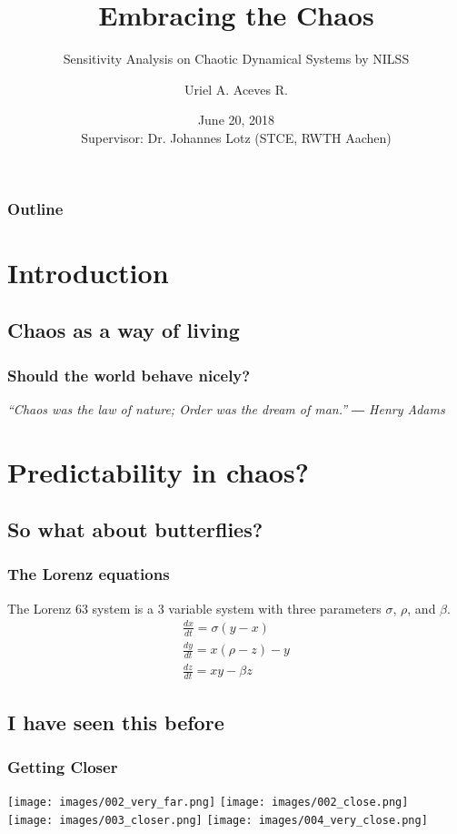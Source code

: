 \documentclass{beamer}
\title{Embracing the Chaos}
\subtitle{Sensitivity Analysis on Chaotic Dynamical Systems by NILSS}
\author{Uriel A. Aceves R.}
\date{June 20, 2018\\ \vspace{0.3cm}
Supervisor: Dr. Johannes Lotz (STCE, RWTH Aachen)}
\institute{\url{uriel.aceves@rwth-aachen.de}}
\begin{document}
\begin{frame}[plain,t]
\titlepage
\end{frame}

\begin{frame}%
	\frametitle{Outline}
  \begin{footnotesize}
\tableofcontents
\end{footnotesize}
\end{frame}

\section{Introduction}
  \subsection{Chaos as a way of living}

\begin{frame}
  \frametitle{Should the world behave nicely?}
  \textit{
  “Chaos was the law of nature; Order was the dream of man.”
  ― Henry Adams}

\end{frame}

\section{Predictability in chaos?}
\subsection{So what about butterflies?}

\begin{frame}
  \frametitle{The Lorenz equations}
  The Lorenz 63 system is a 3 variable system with three parameters $\sigma$, $\rho$, and $\beta$.
  \begin{eqnarray}
    \frac{dx}{dt} = \sigma (y-x)\\
    \frac{dy}{dt} = x (\rho -z) -y\\
    \frac{dz}{dt} = xy - \beta z
  \end{eqnarray}
\end{frame}

\subsection{I have seen this before}
  \begin{frame}
    \frametitle{Getting Closer}
    \begin{center}
    \texttt{[image: images/002\_very\_far.png]}
    \texttt{[image: images/002\_close.png]}\\

    \texttt{[image: images/003\_closer.png]}
    \texttt{[image: images/004\_very\_close.png]}
  \end{center}
  \end{frame}
\end{document}
